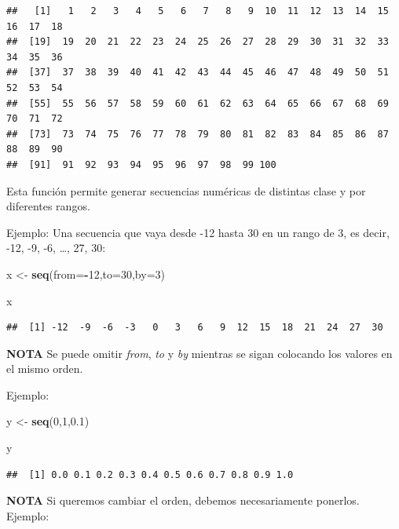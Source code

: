 \documentclass[
]{book}
\newenvironment{Shaded}{\begin{snugshade}}{\end{snugshade}}
\newcommand{\AttributeTok}[1]{\textcolor[rgb]{0.13,0.29,0.53}{#1}}
\newcommand{\DecValTok}[1]{\textcolor[rgb]{0.00,0.00,0.81}{#1}}
\newcommand{\FloatTok}[1]{\textcolor[rgb]{0.00,0.00,0.81}{#1}}
\newcommand{\FunctionTok}[1]{\textcolor[rgb]{0.13,0.29,0.53}{\textbf{#1}}}
\newcommand{\NormalTok}[1]{#1}
\newcommand{\OtherTok}[1]{\textcolor[rgb]{0.56,0.35,0.01}{#1}}
\newcommand{\SpecialCharTok}[1]{\textcolor[rgb]{0.81,0.36,0.00}{\textbf{#1}}}
\begin{document}
\begin{verbatim}
##   [1]   1   2   3   4   5   6   7   8   9  10  11  12  13  14  15  16  17  18
##  [19]  19  20  21  22  23  24  25  26  27  28  29  30  31  32  33  34  35  36
##  [37]  37  38  39  40  41  42  43  44  45  46  47  48  49  50  51  52  53  54
##  [55]  55  56  57  58  59  60  61  62  63  64  65  66  67  68  69  70  71  72
##  [73]  73  74  75  76  77  78  79  80  81  82  83  84  85  86  87  88  89  90
##  [91]  91  92  93  94  95  96  97  98  99 100
\end{verbatim}

Esta función permite generar secuencias numéricas de distintas clase y por diferentes rangos.

Ejemplo:
Una secuencia que vaya desde -12 hasta 30 en un rango de 3, es decir, -12, -9, -6, \ldots, 27, 30:

\begin{Shaded}
\begin{Highlighting}[]
\NormalTok{x }\OtherTok{\textless{}{-}} \FunctionTok{seq}\NormalTok{(}\AttributeTok{from=}\SpecialCharTok{{-}}\DecValTok{12}\NormalTok{,}\AttributeTok{to=}\DecValTok{30}\NormalTok{,}\AttributeTok{by=}\DecValTok{3}\NormalTok{)}

\NormalTok{x}
\end{Highlighting}
\end{Shaded}

\begin{verbatim}
##  [1] -12  -9  -6  -3   0   3   6   9  12  15  18  21  24  27  30
\end{verbatim}

\textbf{NOTA} Se puede omitir \emph{from}, \emph{to} y \emph{by} mientras se sigan colocando los valores en el mismo orden.

Ejemplo:

\begin{Shaded}
\begin{Highlighting}[]
\NormalTok{y }\OtherTok{\textless{}{-}} \FunctionTok{seq}\NormalTok{(}\DecValTok{0}\NormalTok{,}\DecValTok{1}\NormalTok{,}\FloatTok{0.1}\NormalTok{)}

\NormalTok{y}
\end{Highlighting}
\end{Shaded}

\begin{verbatim}
##  [1] 0.0 0.1 0.2 0.3 0.4 0.5 0.6 0.7 0.8 0.9 1.0
\end{verbatim}

\textbf{NOTA} Si queremos cambiar el orden, debemos necesariamente ponerlos.
Ejemplo:
\end{document}
